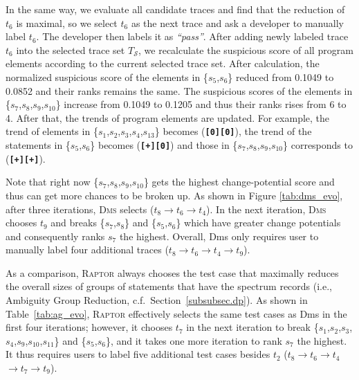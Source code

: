 In the same way, we evaluate all candidate traces and find that the reduction of $t_{6}$ is maximal, so we select $t_{6}$ as the next trace and ask a developer to manually label $t_{6}$.
The developer then labels it as {\em ``pass''}.  After adding newly labeled trace $t_{6}$ into the selected trace set $T_{\mathcal{S}}$, we recalculate the suspicious score
of all program elements according to the current selected trace set. After calculation, the normalized suspicious score of the elements in \{$s_{5}$,$s_{6}$\} reduced from 0.1049 to 0.0852 and their ranks remains the same. The suspicious scores of
the elements in \{$s_{7}$,$s_{8}$,$s_{9}$,$s_{10}$\} increase from 0.1049 to 0.1205 and thus their ranks rises from 6 to 4. After that, the trends of program elements are updated. For example, the trend of elements in \{$s_{1}$,$s_{2}$,$s_{3}$,$s_{4}$,$s_{13}$\} becomes ({\bf\texttt{[0]}}{\bf\texttt{[0]}}), the trend
of the statements in \{$s_{5}$,$s_{6}$\} becomes ({\bf\texttt{[+]}}{\bf\texttt{[0]}}) and those in \{$s_{7}$,$s_{8}$,$s_{9}$,$s_{10}$\} corresponds to ({\bf\texttt{[+]}}{\bf\texttt{[+]}}).


Note that right now \{$s_{7}$,$s_{8}$,$s_{9}$,$s_{10}$\} gets the highest change-potential score and thus can get more chances to be broken up.
As shown in Figure \ref{tab:dms_evo},
after three iterations,
\textsc{Dms} selects (\texttt{$t_{8}$}$\rightarrow$\texttt{$t_{6}$}$\rightarrow$\texttt{$t_{4}$}). In the next iteration, \textsc{Dms} chooses $t_{9}$ and breaks \{$s_{7}$,$s_{8}$\} and \{$s_{5}$,$s_{6}$\} which have greater change potentials and consequently ranks $s_7$ the highest. Overall, {\sc Dms} only requires user to manually label four additional traces (\texttt{$t_{8}$}$\rightarrow$\texttt{$t_{6}$}$\rightarrow$\texttt{$t_{4}$}$\rightarrow$\texttt{$t_{9}$}).

As a comparison, \textsc{Raptor} always chooses the test case that maximally reduces the overall sizes of groups of statements that have the spectrum records (i.e., Ambiguity Group Reduction, c.f.\ Section~\ref{subsubsec.dp}). As shown in Table~\ref{tab:ag_evo}, \textsc{Raptor} effectively selects the same test cases as {\sc Dms} in the first four iterations; however, it chooses $t_{7}$ in the next iteration to break \{$s_{1}$,$s_{2}$,$s_{3}$,$s_{4}$,$s_{9}$,$s_{10}$,$s_{11}$\} and \{$s_{5}$,$s_{6}$\}, and it takes one more iteration to rank $s_7$ the highest.
It thus requires users to label five additional test cases besides $t_2$ (\texttt{$t_{8}$}$\rightarrow$\texttt{$t_{6}$}$\rightarrow$\texttt{$t_{4}$}$\rightarrow$\texttt{$t_{7}$}$\rightarrow$\texttt{$t_{9}$}).
